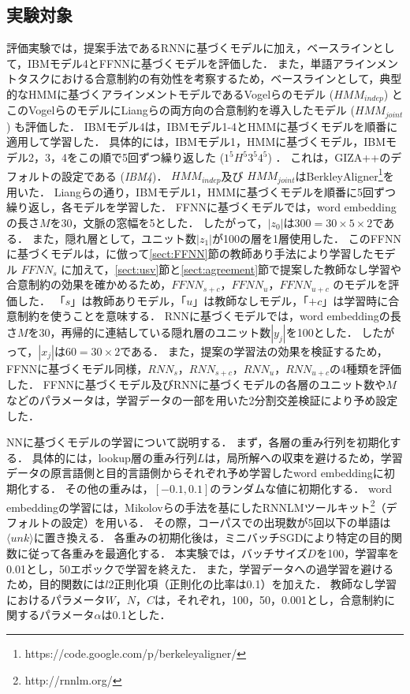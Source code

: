 \documentclass[japanese]{jnlp_1.4}
\begin{document}
\subsection{実験対象}
\label{sect:method}

評価実験では，提案手法であるRNNに基づくモデルに加え，ベースラインとして，IBMモデル4とFFNNに基づくモデルを評価した．
また，単語アラインメントタスクにおける合意制約の有効性を考察するため，ベースラインとして，典型的なHMMに基づくアラインメントモデルであるVogelらのモデル\cite{vogel96} ($\mathit{HMM}_{indep}$) とこのVogelらのモデルにLiangらの両方向の合意制約\cite{liang06}を導入したモデル ($\mathit{HMM}_{joint}$) も評価した．
IBMモデル4は，IBMモデル1-4とHMMに基づくモデルを順番に適用して学習した\cite{och03}．
具体的には，IBMモデル1，HMMに基づくモデル，IBMモデル2，3，4をこの順で5回ずつ繰り返した ($1^{5}H^{5}3^{5}4^{5}$) ．
これは，GIZA++のデフォルトの設定である ({\it IBM4})．
$\mathit{HMM}_\mathit{indep}$及び $\mathit{HMM}_\mathit{joint}$はBerkleyAligner\footnote{https://code.google.com/p/berkeleyaligner/}を用いた．
Liangらの通り，IBMモデル1，HMMに基づくモデルを順番に5回ずつ繰り返し，各モデルを学習した\cite{liang06}．
FFNNに基づくモデルでは，word embeddingの長さ$M$を30，文脈の窓幅を5とした．
したがって，$|z_{0}|$は$300=30 \times 5 \times 2$である．
また，隠れ層として，ユニット数$|z_{1}|$が100の層を1層使用した．
このFFNNに基づくモデルは，\cite{yang13}に倣って\ref{sect:FFNN}節の教師あり手法により学習したモデル $\mathit{FFNN}_{s}$ に加えて，\ref{sect:usv}節と\ref{sect:agreement}節で提案した教師なし学習や合意制約の効果を確かめるため，$\mathit{FFNN}_{s+c}$，$\mathit{FFNN}_{u}$，$\mathit{FFNN}_{u+c}$ のモデルを評価した．
「$s$」は教師ありモデル，「$u$」は教師なしモデル，「$+c$」は学習時に合意制約を使うことを意味する．
RNNに基づくモデルでは，word embeddingの長さ$M$を30，再帰的に連結している隠れ層のユニット数$|y_{j}|$を100とした．
したがって，$|x_{j}|$は$60=30 \times 2$である．
また，提案の学習法の効果を検証するため，FFNNに基づくモデル同様，$\mathit{RNN}_{s}$，$\mathit{RNN}_{s+c}$，$\mathit{RNN}_{u}$，$\mathit{RNN}_{u+c}$の4種類を評価した．
FFNNに基づくモデル及びRNNに基づくモデルの各層のユニット数や$M$などのパラメータは，学習データの一部を用いた2分割交差検証により予め設定した．

NNに基づくモデルの学習について説明する．
まず，各層の重み行列を初期化する．
具体的には，lookup層の重み行列$L$は，局所解への収束を避けるため，学習データの原言語側と目的言語側からそれぞれ予め学習したword embeddingに初期化する．
その他の重みは，$[-0.1, 0.1]$のランダムな値に初期化する．
word embeddingの学習には，Mikolovらの手法\cite{mikolov10}を基にしたRNNLMツールキット\footnote{http://rnnlm.org/}（デフォルトの設定）を用いる．
その際，コーパスでの出現数が5回以下の単語は$\langle unk \rangle$に置き換える．
各重みの初期化後は，ミニバッチSGDにより特定の目的関数に従って各重みを最適化する．
本実験では，バッチサイズ$D$を100，学習率を0.01とし，50エポックで学習を終えた．
また，学習データへの過学習を避けるため，目的関数には$l2$正則化項（正則化の比率は0.1）を加えた．
教師なし学習におけるパラメータ$W$，$N$，$C$は，それぞれ，100，50，0.001とし，合意制約に関するパラメータ$\alpha$は0.1とした．
\end{document}

